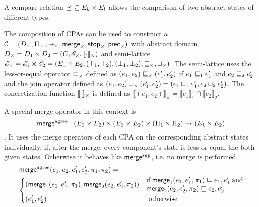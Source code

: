 A compare relation $\preceq\ \subseteq E_k \times E_l$ allows the comparison of two abstract states of different types.

The composition of CPAs can be used to construct a \compositeCPA\ $\mathcal{C} = (D_\times, \Pi_\times, \rightsquigarrow_\times, \operatorname{\operatorname{\mathsf{merge}}}_\times, \operatorname{\operatorname{\mathsf{stop}}}_\times, \operatorname{\operatorname{\mathsf{prec}}}_\times)$
with abstract domain $D_\times = D_1 \times D_2 = (C, \mathscr{E}_\times, \llbracket \cdot \rrbracket_\times)$
and semi-lattice $\mathscr{E}_\times = \mathscr{E}_1 \times \mathscr{E}_2 = (E_1 \times E_2, (\top_1, \top_2), (\bot_1, \bot_2), \sqsubseteq_\times, \sqcup_\times)$.
The semi-lattice uses the less-or-equal operator $\sqsubseteq_\times$ defined as $(e_1, e_2) \sqsubseteq_\times (e'_1, e'_2)$ if $e_1 \sqsubseteq_1 e'_1$ and $e_2 \sqsubseteq_2 e'_2$
and the join operator defined as $(e_1, e_2) \sqcup_\times (e'_1, e'_2) = (e_1 \sqcup_1 e'_1, e_2 \sqcup_2 e'_2)$.
The concretization function $\llbracket \cdot \rrbracket_\times$ is defined as $\llbracket (e_1, e_2) \rrbracket_\times = \llbracket e_1 \rrbracket_1 \cap \llbracket e_2 \rrbracket_2$.

A special merge operator in this context is \[\operatorname{{\operatorname{\operatorname{\mathsf{merge}}}^{agree}}} : (E_1 \times E_2) \times (E_1 \times E_2) \times (\Pi_1 \times \Pi_2) \rightarrow (E_1 \times E_2)\]. It uses the merge operators of each CPA on the corresponding abstract states individually, if, after the merge, every component's state is less or equal the both given states. Otherwise it behaves like $\operatorname{\operatorname{\mathsf{merge}}}^{sep}$, i.e. no merge is performed.
\begin{align*}
&\mergeAgree(e_1, e_2, e'_1, e'_2, \pi_1, \pi_2) =\\
&\begin{dcases}
(\cpaMerge_1(e_1, e'_1, \pi_1), \cpaMerge_2(e_2, e'_2, \pi_2)) & \parbox{.4\textwidth}{if $\cpaMerge_1 (e_1, e'_1, \pi_1) \lesserEqual e_1, e'_1$ and $\cpaMerge_2(e_2, e'_2, \pi_2) \lesserEqual e_2, e'_2$}\\
(e'_1, e'_2) & \text{ otherwise}
\end{dcases}
\end{align*}


